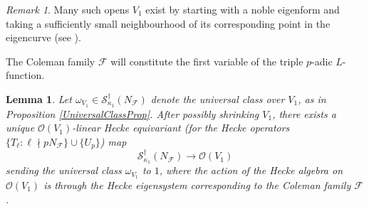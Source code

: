 \documentclass[10pt, oneside]{amsart}
\numberwithin{equation}{subsection}
\newtheorem{lemma}[equation]{Lemma}
\theoremstyle{definition}
\theoremstyle{remark}
\newtheorem{remark}[equation]{Remark}
\begin{document}
\begin{remark}
Many such opens $V_1$ exist by starting with a noble eigenform and taking a sufficiently small neighbourhood of its corresponding point in the eigencurve (see \cite{bellpadic}). 
\end{remark}

The Coleman family $\mathcal{F}$ will constitute the first variable of the triple $p$-adic $L$-function.

\begin{lemma}
Let $\omega_{V_1} \in \mathscr{S}^{\dagger}_{\kappa_1}(N_{\mathcal{F}})$ denote the universal class over $V_1$, as in Proposition \ref{UniversalClassProp}. After possibly shrinking $V_1$, there exists a unique $\mathcal{O}(V_1)$-linear Hecke equivariant (for the Hecke operators $\{ T_{\ell} : \ell \nmid p N_{\mathcal{F}} \} \cup \{U_p \}$) map
\begin{equation} \label{LevelNFmap}
\mathscr{S}^{\dagger}_{\kappa_1}(N_{\mathcal{F}}) \to \mathcal{O}(V_1)
\end{equation}
sending the universal class $\omega_{V_1}$ to $1$, where the action of the Hecke algebra on $\mathcal{O}(V_1)$ is through the Hecke eigensystem corresponding to the Coleman family $\mathcal{F}$.
\end{lemma}
\end{document}
